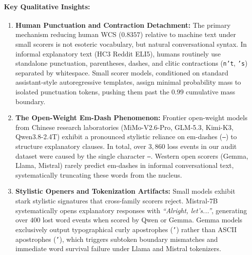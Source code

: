 \documentclass[11pt,a4paper,twocolumn]{article}
\begin{document}
\paragraph{Key Qualitative Insights:}
\begin{enumerate}
    \item \textbf{Human Punctuation and Contraction Detachment:} The primary mechanism reducing human WCS ($0.8357$) relative to machine text under small scorers is not esoteric vocabulary, but natural conversational syntax. In informal explanatory text (HC3 Reddit ELI5), humans routinely use standalone punctuation, parentheses, dashes, and clitic contractions (\texttt{n't}, \texttt{'s}) separated by whitespace. Small scorer models, conditioned on standard assistant-style autoregressive templates, assign minimal probability mass to isolated punctuation tokens, pushing them past the $0.99$ cumulative mass boundary.
    \item \textbf{The Open-Weight Em-Dash Phenomenon:} Frontier open-weight models from Chinese research laboratories (MiMo-V2.6-Pro, GLM-5.3, Kimi-K3, Qwen3.8-2.4T) exhibit a pronounced stylistic reliance on em-dashes (\texttt{—}) to structure explanatory clauses. In total, over $3{,}860$ loss events in our audit dataset were caused by the single character \texttt{—}. Western open scorers (Gemma, Llama, Mistral) rarely predict em-dashes in informal conversational text, systematically truncating these words from the nucleus.
    \item \textbf{Stylistic Openers and Tokenization Artifacts:} Small models exhibit stark stylistic signatures that cross-family scorers reject. Mistral-7B systematically opens explanatory responses with \emph{``Alright, let's...''}, generating over $400$ lost word events when scored by Qwen or Gemma. Gemma models exclusively output typographical curly apostrophes (\texttt{’}) rather than ASCII apostrophes (\texttt{'}), which triggers subtoken boundary mismatches and immediate word survival failure under Llama and Mistral tokenizers.
\end{enumerate}
\end{document}
